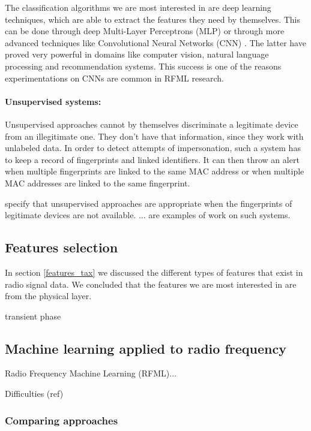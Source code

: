 The classification algorithms we are most interested in are deep learning techniques, which are able to extract the features they need by themselves. This can be done through deep Multi-Layer Perceptrons (MLP) \cite{delgado_passive_2020, stankowicz_complex_2019} or through more advanced techniques like Convolutional Neural Networks (CNN) \cite{riyaz_deep_2018, oyedare_estimating_2019, youssef_machine_2017, morin_transmitter_2019, sankhe_no_2019}. The latter have proved very powerful in domains like computer vision, natural language processing and recommendation systems. This success is one of the reasons experimentations on CNNs are common in RFML research.

\paragraph{Unsupervised systems:} Unsupervised approaches cannot by themselves discriminate a legitimate device from an illegitimate one. They don't have that information, since they work with unlabeled data. In order to detect attempts of impersonation, such a system has to keep a record of fingerprints and linked identifiers. It can then throw an alert when multiple fingerprints are linked to the same MAC address or when multiple MAC addresses are linked to the same fingerprint.

\textcite{xu_device_2015} specify that unsupervised approaches are appropriate when the fingerprints of legitimate devices are not available. ... are examples of work on such systems.

\subsection{Features selection}

In section \ref{features_tax} we discussed the different types of features that exist in radio signal data. We concluded that the features we are most interested in are from the physical layer.

transient phase

\subsection{Machine learning applied to radio frequency}

Radio Frequency Machine Learning (RFML)...

Difficulties (ref)

\subsubsection{Comparing approaches}

